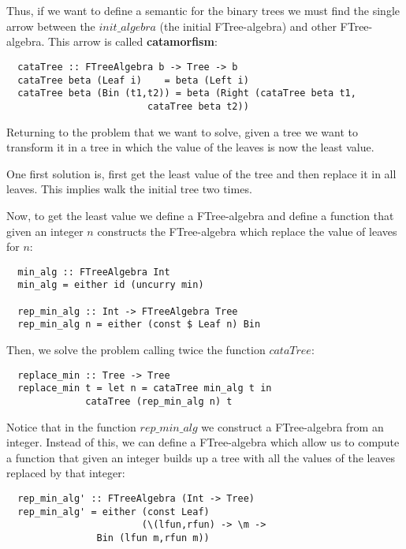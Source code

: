 \documentclass[a4paper,10pt]{article}
\begin{document}
\

\

Thus, if we want to define a semantic for the binary trees we must find the single arrow
between the $init\_algebra$ (the initial FTree-algebra) and other FTree-algebra. This arrow
is called \textbf{catamorfism}:

\begin{lstlisting}
  cataTree :: FTreeAlgebra b -> Tree -> b
  cataTree beta (Leaf i)    = beta (Left i)
  cataTree beta (Bin (t1,t2)) = beta (Right (cataTree beta t1,
					     cataTree beta t2))
\end{lstlisting}

Returning to the problem that we want to solve, given a tree we want to transform it
in a tree in which the value of the leaves is now the least value.

One first solution is, first get the least value of the tree and then replace it in
all leaves. This implies walk the initial tree two times.

Now, to get the least value we define a FTree-algebra and define a function that
given an integer $n$ constructs the FTree-algebra which replace the value of leaves
for $n$:

\begin{lstlisting}
  min_alg :: FTreeAlgebra Int
  min_alg = either id (uncurry min)

  rep_min_alg :: Int -> FTreeAlgebra Tree
  rep_min_alg n = either (const $ Leaf n) Bin
\end{lstlisting}

Then, we solve the problem calling twice the function $cataTree$:

\begin{lstlisting}
  replace_min :: Tree -> Tree
  replace_min t = let n = cataTree min_alg t in
		      cataTree (rep_min_alg n) t
\end{lstlisting}

Notice that in the function $rep\_min\_alg$ we construct a FTree-algebra from an integer.
Instead of this, we can define a FTree-algebra which allow us to compute a
function that given an integer builds up a tree with all the values of the leaves
replaced by that integer:

\begin{lstlisting}
  rep_min_alg' :: FTreeAlgebra (Int -> Tree)
  rep_min_alg' = either (const Leaf) 
                        (\(lfun,rfun) -> \m -> 
			    Bin (lfun m,rfun m))
\end{lstlisting}
\end{document}
